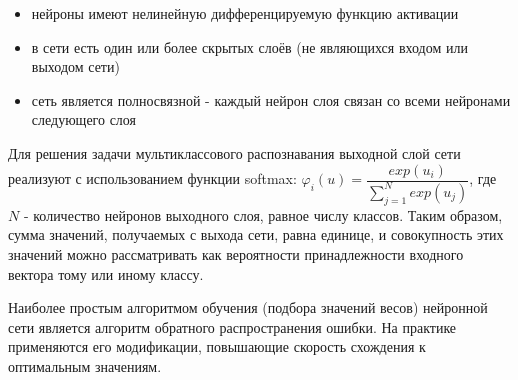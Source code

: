 \begin{itemize}
\item нейроны имеют нелинейную дифференцируемую функцию активации
\item в сети есть один или более скрытых слоёв (не являющихся входом или выходом сети)
\item сеть является полносвязной - каждый нейрон слоя связан со всеми нейронами следующего слоя
\end{itemize}

Для решения задачи мультиклассового распознавания выходной слой сети реализуют с использованием функции softmax: $\varphi_i(u)=\dfrac{exp(u_i)}{\sum\limits_{j=1}^N exp(u_j)}$, где $N$ - количество нейронов выходного слоя, равное числу классов. Таким образом, сумма значений, получаемых с выхода сети, равна единице, и совокупность этих значений можно рассматривать как вероятности принадлежности входного вектора тому или иному классу.

Наиболее простым алгоритмом обучения (подбора значений весов) нейронной сети является алгоритм обратного распространения ошибки\cite{haykin_nn}. На практике применяются его модификации, повышающие скорость схождения к оптимальным значениям.

